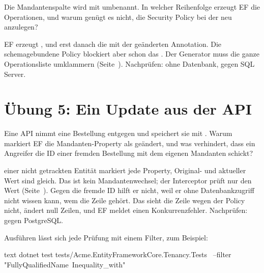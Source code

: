 Die Mandantenspalte wird mit 
umbenannt. In welcher Reihenfolge erzeugt EF die Operationen, und warum genügt es nicht, die
Security Policy bei der  neu anzulegen?

\begin{note}[Lösung]
  EF erzeugt ,  und erst danach
  die  mit der geänderten Annotation. Die
  schemagebundene Policy blockiert aber schon das . Der Generator
  muss die ganze Operationsliste umklammern
  (Seite~\pageref{sec:sqlserver-schema-bound-changes}).
  Nachprüfen: 
  ohne Datenbank,  gegen
  SQL Server.
\end{note}

\section{Übung 5: Ein Update aus der API}

Eine API nimmt eine Bestellung entgegen und speichert sie mit . Warum markiert EF
die Mandanten-Property als geändert, und was verhindert, dass ein Angreifer die ID einer
fremden Bestellung mit dem eigenen Mandanten schickt?

\begin{note}[Lösung]
   einer nicht getrackten Entität markiert jede Property, Original- und aktueller
  Wert sind gleich. Das ist kein Mandantenwechsel; der Interceptor prüft nur den Wert
  (Seite~\pageref{sec:tracking-flag-versus-value}). Gegen die fremde ID hilft er nicht, weil er
  ohne Datenbankzugriff nicht wissen kann, wem die Zeile gehört. Das  sieht die
  Zeile wegen der Policy nicht, ändert null Zeilen, und EF meldet einen Konkurrenzfehler.
  Nachprüfen:  gegen PostgreSQL.
\end{note}

Ausführen lässt sich jede Prüfung mit einem Filter, zum Beispiel:

\begin{sourcecode}[Shell]{text}
dotnet test tests/Acme.EntityFrameworkCore.Tenancy.Tests \
    --filter "FullyQualifiedName~Inequality_with"
\end{sourcecode}

